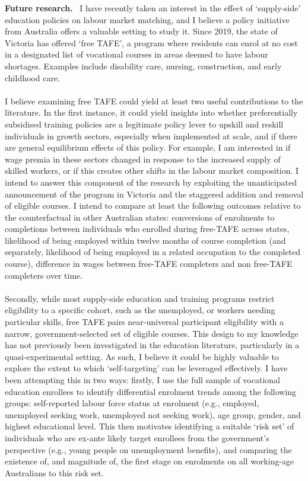 \documentclass[11pt]{article}
\newcommand{\shead}[1]{\par\vspace{0.85em}\noindent\textbf{#1.}\ }
\begin{document}
\shead{Future research} I have recently taken an interest in the effect of `supply-side' education policies on labour market matching, and I believe a policy initiative from Australia offers a valuable setting to study it. Since 2019, the state of Victoria has offered `free TAFE', a program where residents can enrol at no cost in a designated list of vocational courses in areas deemed to have labour shortages. Examples include disability care, nursing, construction, and early childhood care.
\\~\\
I believe examining free TAFE could yield at least two useful contributions to the literature. In the first instance, it could yield insights into whether preferentially subsidised training policies are a legitimate policy lever to upskill and reskill individuals in growth sectors, especially when implemented at scale, and if there are general equilibrium effects of this policy. For example, I am interested in if wage premia in these sectors changed in response to the increased supply of skilled workers, or if this creates other shifts in the labour market composition. I intend to answer this component of the research by exploiting the unanticipated announcement of the program in Victoria and the staggered addition and removal of eligible courses. I intend to compare at least the following outcomes relative to the counterfactual in other Australian states: conversions of enrolments to completions between individuals who enrolled during free-TAFE across states, likelihood of being employed within twelve months of course completion (and separately, likelihood of being employed in a related occupation to the completed course), difference in wages between free-TAFE completers and non free-TAFE completers over time.
\\~\\
Secondly, while most supply-side education and training programs restrict eligibility to a specific cohort, such as the unemployed, or workers needing particular skills, free TAFE pairs near-universal participant eligibility with a narrow, government-selected set of eligible courses. This design to my knowledge has not previously been investigated in the education literature, particularly in a quasi-experimental setting. As such, I believe it could be highly valuable to explore the extent to which `self-targeting' can be leveraged effectively. I have been attempting this in two ways: firstly, I use the full sample of vocational education enrollees to identify differential enrolment trends among the following groups: self-reported labour force status at enrolment (e.g., employed, unemployed seeking work, unemployed not seeking work), age group, gender, and highest educational level. This then motivates identifying a suitable `risk set' of individuals who are ex-ante likely target enrollees from the government's perspective (e.g., young people on unemployment benefits), and comparing the existence of, and magnitude of, the first stage on enrolments on all working-age Australians to this risk set.
\end{document}
